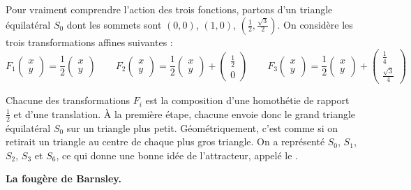 \documentclass[11pt,class=report,crop=false]{standalone}
\begin{document}
Pour vraiment comprendre l'action des trois fonctions, partons d'un triangle équilatéral $S_0$ dont les sommets sont $(0,0)$,
$(1,0)$, $(\frac12,\frac{\sqrt3}{2})$. On considère les trois transformations affines suivantes :
$$F_1 \begin{pmatrix}x \\ y \end{pmatrix} = \frac12 \begin{pmatrix}x \\ y \end{pmatrix} \qquad
F_2\begin{pmatrix}x \\ y \end{pmatrix} = \frac12 \begin{pmatrix}x \\ y \end{pmatrix}+ \begin{pmatrix} \frac12 \\ 0 \end{pmatrix} \qquad
F_3\begin{pmatrix}x \\ y \end{pmatrix} = \frac12 \begin{pmatrix}x \\ y \end{pmatrix}+ \begin{pmatrix}\frac14 \\ \frac{\sqrt3}{4} \end{pmatrix}
$$

Chacune des transformations $F_i$ est la composition d'une homothétie de rapport $\frac12$ et d'une translation.
\`A la première étape, chacune envoie donc le grand triangle équilatéral $S_0$ sur un triangle plus petit.
Géométriquement, c'est comme si on retirait un triangle au centre de chaque plus gros triangle.
On a représenté $S_0$, $S_1$, $S_2$, $S_3$ et $S_6$, ce qui donne une bonne idée
de l'attracteur, appelé le .


\bigskip


\textbf{La fougère de Barnsley.}
\end{document}
